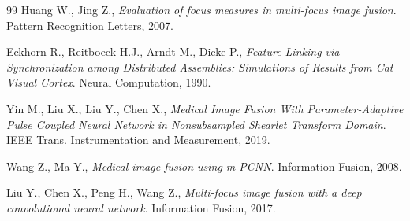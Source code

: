 \documentclass[12pt,a4paper]{article}
\begin{document}
\begin{thebibliography}{99}
Huang W., Jing Z., \emph{Evaluation of focus measures in multi-focus image fusion}. Pattern Recognition Letters, 2007.

Eckhorn R., Reitboeck H.J., Arndt M., Dicke P., \emph{Feature Linking via Synchronization among Distributed Assemblies: Simulations of Results from Cat Visual Cortex}. Neural Computation, 1990.

Yin M., Liu X., Liu Y., Chen X., \emph{Medical Image Fusion With Parameter-Adaptive Pulse Coupled Neural Network in Nonsubsampled Shearlet Transform Domain}. IEEE Trans. Instrumentation and Measurement, 2019.

Wang Z., Ma Y., \emph{Medical image fusion using m-PCNN}. Information Fusion, 2008.

Liu Y., Chen X., Peng H., Wang Z., \emph{Multi-focus image fusion with a deep convolutional neural network}. Information Fusion, 2017.

\end{thebibliography}
\end{document}
